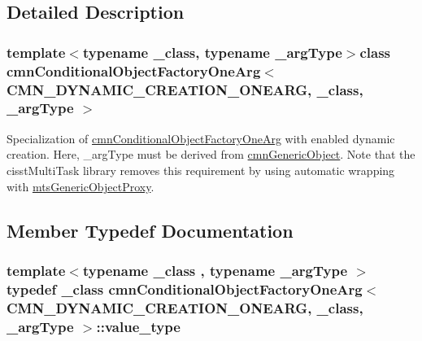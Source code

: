 \subsection{Detailed Description}
\subsubsection*{template$<$typename \-\_\-class, typename \-\_\-arg\-Type$>$class cmn\-Conditional\-Object\-Factory\-One\-Arg$<$ C\-M\-N\-\_\-\-D\-Y\-N\-A\-M\-I\-C\-\_\-\-C\-R\-E\-A\-T\-I\-O\-N\-\_\-\-O\-N\-E\-A\-R\-G, \-\_\-class, \-\_\-arg\-Type $>$}

Specialization of \hyperlink{classcmn_conditional_object_factory_one_arg}{cmn\-Conditional\-Object\-Factory\-One\-Arg} with enabled dynamic creation. Here, \-\_\-arg\-Type must be derived from \hyperlink{classcmn_generic_object}{cmn\-Generic\-Object}. Note that the cisst\-Multi\-Task library removes this requirement by using automatic wrapping with \hyperlink{classmts_generic_object_proxy}{mts\-Generic\-Object\-Proxy}. 

\subsection{Member Typedef Documentation}
\hypertarget{classcmn_conditional_object_factory_one_arg_3_01_c_m_n___d_y_n_a_m_i_c___c_r_e_a_t_i_o_n___o_n_ede9b022187ff72195baf5864ecd7352d_a33029699c2ed3d54426007bf39dd777c}{
\subsubsection[{value\-\_\-type}]{\setlength{\rightskip}{0pt plus 5cm}template$<$typename \-\_\-class , typename \-\_\-arg\-Type $>$ typedef \-\_\-class {\bf cmn\-Conditional\-Object\-Factory\-One\-Arg}$<$ {\bf C\-M\-N\-\_\-\-D\-Y\-N\-A\-M\-I\-C\-\_\-\-C\-R\-E\-A\-T\-I\-O\-N\-\_\-\-O\-N\-E\-A\-R\-G}, \-\_\-class, \-\_\-arg\-Type $>$\-::{\bf value\-\_\-type}}}\label{classcmn_conditional_object_factory_one_arg_3_01_c_m_n___d_y_n_a_m_i_c___c_r_e_a_t_i_o_n___o_n_ede9b022187ff72195baf5864ecd7352d_a33029699c2ed3d54426007bf39dd777c}


